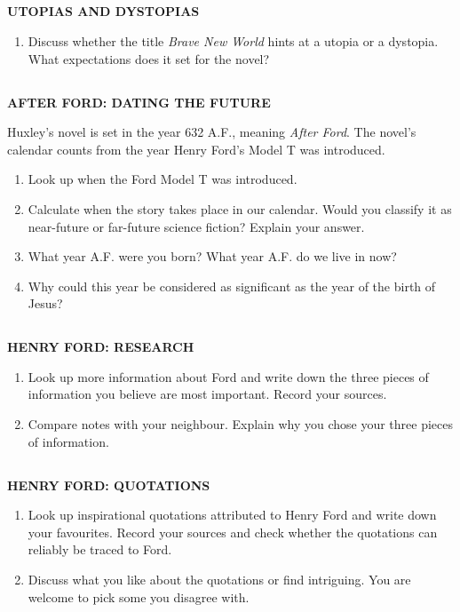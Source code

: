 \documentclass[10pt,a4paper,table]{article}
\begin{document}
\subsection{}
\textbf{UTOPIAS AND DYSTOPIAS}
\begin{enumerate}[label=\textbf{\alph*.},leftmargin=1.5em]
  \item Discuss whether the title \emph{Brave New World} hints at a utopia or a dystopia. What expectations does it set for the novel?
\end{enumerate}

\clearpage

\subsection{}
\textbf{AFTER FORD: DATING THE FUTURE}

Huxley's novel is set in the year 632 A.F., meaning \emph{After Ford}. The novel's calendar counts from the year Henry Ford's Model T was introduced.

\begin{enumerate}[label=\textbf{\alph*.},leftmargin=1.5em]
  \item Look up when the Ford Model T was introduced.
  \item Calculate when the story takes place in our calendar. Would you classify it as near-future or far-future science fiction? Explain your answer.
  \item What year A.F. were you born? What year A.F. do we live in now?
  \item Why could this year be considered as significant as the year of the birth of Jesus?
\end{enumerate}

\subsection{}
\textbf{HENRY FORD: RESEARCH}
\begin{enumerate}[label=\textbf{\alph*.},leftmargin=1.5em]
  \item Look up more information about Ford and write down the three pieces of information you believe are most important. Record your sources.
  \item Compare notes with your neighbour. Explain why you chose your three pieces of information.
\end{enumerate}

\subsection{}
\textbf{HENRY FORD: QUOTATIONS}
\begin{enumerate}[label=\textbf{\alph*.},leftmargin=1.5em]
  \item Look up inspirational quotations attributed to Henry Ford and write down your favourites. Record your sources and check whether the quotations can reliably be traced to Ford.
  \item Discuss what you like about the quotations or find intriguing. You are welcome to pick some you disagree with.
\end{enumerate}
\end{document}
